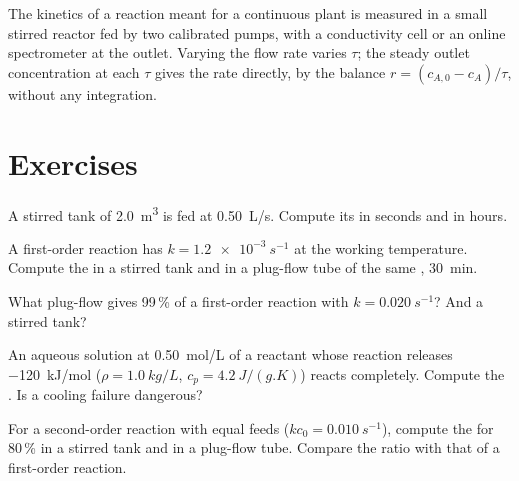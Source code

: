 \begin{inthelab}
The kinetics of a reaction meant for a continuous plant is measured in a
small stirred reactor fed by two calibrated pumps, with a conductivity cell
or an online spectrometer at the outlet. Varying the flow rate varies $\tau$;
the steady outlet concentration at each $\tau$ gives the rate directly, by the
balance $r = (c_{A,0} - c_A)/\tau$, without any integration.
\end{inthelab}

\section{Exercises}

\begin{exercise}[$\star$]\label{exo:b2:continuous-reactors:1}
A stirred tank of \qty{2.0}{m^3} is fed at \qty{0.50}{L/s}. Compute its
 in seconds and in hours.
\end{exercise}

\begin{exercise}[$\star$]\label{exo:b2:continuous-reactors:2}
A first-order reaction has $k = \qty{1.2e-3}{s^{-1}}$ at the working
temperature. Compute the  in a stirred tank and in a plug-flow tube
of the same , \qty{30}{min}.
\end{exercise}

\begin{exercise}[$\star$]\label{exo:b2:continuous-reactors:3}
What plug-flow  gives 99\,\%  of a first-order
reaction with $k = \qty{0.020}{s^{-1}}$? And a stirred tank?
\end{exercise}

\begin{exercise}[$\star$]\label{exo:b2:continuous-reactors:4}
An aqueous solution at \qty{0.50}{mol/L} of a reactant whose reaction
releases \qty{-120}{kJ/mol} ($\rho = \qty{1.0}{kg/L}$, $c_p =
\qty{4.2}{J/(g.K)}$) reacts completely. Compute the . Is a cooling failure dangerous?
\end{exercise}

\begin{exercise}[$\star\star$]\label{exo:b2:continuous-reactors:5}
For a second-order reaction with equal feeds ($kc_0 = \qty{0.010}{s^{-1}}$),
compute the  for 80\,\%  in a stirred tank and in a
plug-flow tube. Compare the ratio with that of a first-order reaction.
\end{exercise}

